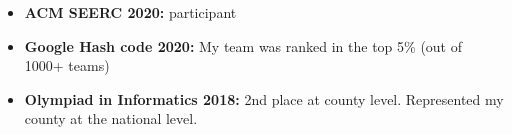 
\begin{itemize}

\item \textbf{ACM SEERC 2020:} participant


\item \textbf{Google Hash code 2020:} My team was ranked in the top 5\% (out of 1000+ teams)


\item \textbf{Olympiad in Informatics 2018:} 2nd place at county level. Represented my county at the national level.

\end{itemize} 
